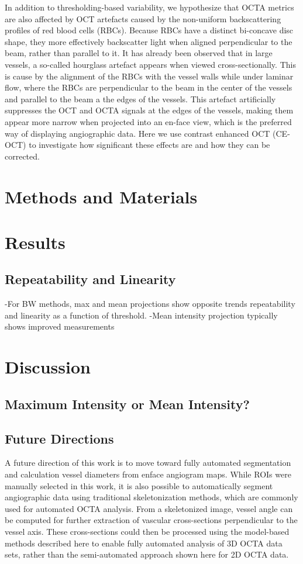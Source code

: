 \documentclass{optica-article}
\begin{document}
In addition to thresholding-based variability, we hypothesize that OCTA metrics are also affected by OCT artefacts caused by the non-uniform backscattering profiles of red blood cells (RBCs).  Because RBCs have a distinct bi-concave disc shape, they more effectively backscatter light when aligned perpendicular to the beam, rather than parallel to it.  It has already been observed that in large vessels, a so-called hourglass artefact appears when viewed cross-sectionally.  This is cause by the alignment of the RBCs with the vessel walls while under laminar flow, where the RBCs are perpendicular to the beam in the center of the vessels and parallel to the beam a the edges of the vessels.  This artefact artificially suppresses the OCT and OCTA signals at the edges of the vessels, making them appear more narrow when projected into an en-face view, which is the preferred way of displaying angiographic data.  Here we use contrast enhanced OCT (CE-OCT) to investigate how significant these effects are and how they can be corrected.

\section{Methods and Materials}

\section{Results}

\subsection{Repeatability and Linearity}
-For BW methods, max and mean projections show opposite trends repeatability and linearity as a function of threshold.
-Mean intensity projection typically shows improved measurements

\section{Discussion}
\subsection{Maximum Intensity or Mean Intensity?}

\subsection{Future Directions}
A future direction of this work is to move toward fully automated segmentation and calculation vessel diameters from enface angiogram maps.  While ROIs were manually selected in this work, it is also possible to automatically segment angiographic data using traditional skeletonization methods, which are commonly used for automated OCTA analysis.  From a skeletonized image, vessel angle can be computed for further extraction of vascular cross-sections perpendicular to the vessel axis.  These cross-sections could then be processed using the model-based methods described here to enable fully automated analysis of 3D OCTA data sets, rather than the semi-automated approach shown here for 2D OCTA data.
\end{document}
